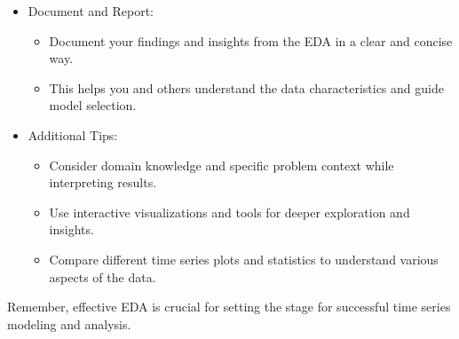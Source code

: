 \begin{itemize}
\begin{itemize}
                        \end{itemize}
                    \item Document and Report:
                        \begin{itemize}
                            \item Document your findings and insights from the EDA in a clear and concise way.
                            \item This helps you and others understand the data characteristics and guide model selection.
                        \end{itemize}
                    \item Additional Tips:
                        \begin{itemize}
                            \item Consider domain knowledge and specific problem context while interpreting results.
                            \item Use interactive visualizations and tools for deeper exploration and insights.
                            \item Compare different time series plots and statistics to understand various aspects of the data.
                        \end{itemize}
                    \end{itemize}
                
                Remember, effective EDA is crucial for setting the stage for successful time series modeling and analysis.


